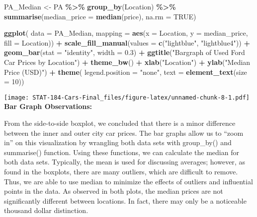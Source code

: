 \documentclass[
]{article}
\newenvironment{Shaded}{\begin{snugshade}}{\end{snugshade}}
\newcommand{\AttributeTok}[1]{\textcolor[rgb]{0.13,0.29,0.53}{#1}}
\newcommand{\ConstantTok}[1]{\textcolor[rgb]{0.56,0.35,0.01}{#1}}
\newcommand{\DecValTok}[1]{\textcolor[rgb]{0.00,0.00,0.81}{#1}}
\newcommand{\FloatTok}[1]{\textcolor[rgb]{0.00,0.00,0.81}{#1}}
\newcommand{\FunctionTok}[1]{\textcolor[rgb]{0.13,0.29,0.53}{\textbf{#1}}}
\newcommand{\NormalTok}[1]{#1}
\newcommand{\OtherTok}[1]{\textcolor[rgb]{0.56,0.35,0.01}{#1}}
\newcommand{\SpecialCharTok}[1]{\textcolor[rgb]{0.81,0.36,0.00}{\textbf{#1}}}
\newcommand{\StringTok}[1]{\textcolor[rgb]{0.31,0.60,0.02}{#1}}
\begin{document}
\begin{Shaded}
\begin{Highlighting}[]
\NormalTok{PA\_Median }\OtherTok{\textless{}{-}}\NormalTok{ PA }\SpecialCharTok{\%\textgreater{}\%}
  \FunctionTok{group\_by}\NormalTok{(Location) }\SpecialCharTok{\%\textgreater{}\%}
  \FunctionTok{summarise}\NormalTok{(}\AttributeTok{median\_price =} \FunctionTok{median}\NormalTok{(price), }\AttributeTok{na.rm =} \ConstantTok{TRUE}\NormalTok{)}

\FunctionTok{ggplot}\NormalTok{(}
\AttributeTok{data =}\NormalTok{ PA\_Median,}
\AttributeTok{mapping =} \FunctionTok{aes}\NormalTok{(}\AttributeTok{x =}\NormalTok{ Location, }\AttributeTok{y =}\NormalTok{ median\_price, }\AttributeTok{fill =}\NormalTok{ Location)) }\SpecialCharTok{+}
  \FunctionTok{scale\_fill\_manual}\NormalTok{(}\AttributeTok{values =} \FunctionTok{c}\NormalTok{(}\StringTok{"lightblue"}\NormalTok{, }\StringTok{"lightblue4"}\NormalTok{)) }\SpecialCharTok{+}
  \FunctionTok{geom\_bar}\NormalTok{(}\AttributeTok{stat =} \StringTok{"identity"}\NormalTok{, }\AttributeTok{width =} \FloatTok{0.3}\NormalTok{) }\SpecialCharTok{+}
  \FunctionTok{ggtitle}\NormalTok{(}\StringTok{"Bargraph of Used Ford Car Prices by Location"}\NormalTok{) }\SpecialCharTok{+}
  \FunctionTok{theme\_bw}\NormalTok{() }\SpecialCharTok{+}
  \FunctionTok{xlab}\NormalTok{(}\StringTok{"Location"}\NormalTok{) }\SpecialCharTok{+}
  \FunctionTok{ylab}\NormalTok{(}\StringTok{"Median Price (USD)"}\NormalTok{) }\SpecialCharTok{+}
  \FunctionTok{theme}\NormalTok{(}
  \AttributeTok{legend.position =} \StringTok{"none"}\NormalTok{,}
  \AttributeTok{text =} \FunctionTok{element\_text}\NormalTok{(}\AttributeTok{size =} \DecValTok{10}\NormalTok{))}
\end{Highlighting}
\end{Shaded}

\texttt{[image: STAT-184-Cars-Final\_files/figure-latex/unnamed-chunk-8-1.pdf]}
\textbf{Bar Graph Observations:}

From the side-to-side boxplot, we concluded that there is a minor
difference between the inner and outer city car prices. The bar graphs
allow us to ``zoom in'' on this visualization by wrangling both data
sets with group\_by() and summarise() function. Using these functions,
we can calculate the median for both data sets. Typically, the mean is
used for discussing averages; however, as found in the boxplots, there
are many outliers, which are difficult to remove. Thus, we are able to
use median to minimize the effects of outliers and influential points in
the data. As observed in both plots, the median prices are not
significantly different between locations. In fact, there may only be a
noticeable thousand dollar distinction.
\end{document}
